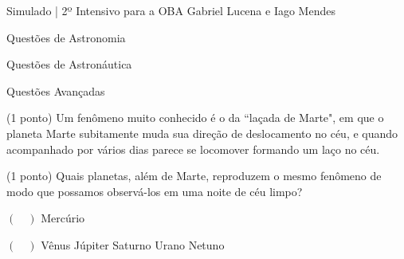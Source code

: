 \documentclass{../lista}
\begin{document}
	\cabecalhoAlt
		{Simulado | 2º Intensivo para a OBA}
		{}
		{Gabriel Lucena e Iago Mendes}


	\begin{secao}{Questões de Astronomia}
	\end{secao}

	\begin{secao}{Questões de Astronáutica}
	\end{secao}

	\begin{secao}{Questões Avançadas}
		\begin{questao}{(1 ponto)}
			Um fenômeno muito conhecido é o da ``laçada de Marte", em que o planeta Marte subitamente muda sua direção de deslocamento no céu, e quando acompanhado por vários dias parece se locomover formando um laço no céu.

			\begin{pergunta}{(1 ponto)}
				Quais planetas, além de Marte, reproduzem o mesmo fenômeno de modo que possamos observá-los em uma noite de céu limpo?


				\begin{multicols}{3}
					\begin{alternativas}
						\item[$(\quad)$] Mercúrio
						\item[$(\quad)$] Vênus
						\alternativaMarcada Júpiter
						\alternativaMarcada Saturno
						\alternativaMarcada Urano
						\alternativaMarcada Netuno
					\end{alternativas}
				\end{multicols}
			\end{pergunta}
		\end{questao}
	\end{secao}
\end{document}
